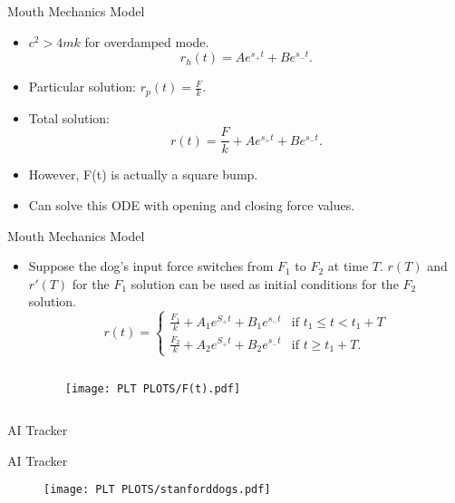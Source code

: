 \documentclass[compress,12pt,mp]{beamer}
\begin{document}
\begin{frame}[t]{Mouth Mechanics Model}
\begin{itemize}
\item \(c^2>4mk\) for overdamped mode.
    \[r_h(t)=Ae^{s_+t} + Be^{s_-t}.\]
\item Particular solution: \(r_p(t)=\frac{F}{k}.\)

    \item Total solution:
    \[r(t)=\frac{F}{k} + Ae^{s_+t} + Be^{s_-t}.\]
\item However, F(t) is actually a square bump. 
\item Can solve this ODE with opening and closing force values.
\end{itemize}
\end{frame}

\begin{frame}[t]{Mouth Mechanics Model}
\begin{itemize}
\item Suppose the dog's input force switches from \(F_1\) to \(F_2\) at time \(T\). \(r(T)\) and \(r'(T)\) for the \(F_1\) solution can be used as initial conditions for the \(F_2\) solution.
\[
r(t)=\begin{cases}
    \frac{F_1}{k}+A_1e^{S_+t}+B_1e^{s_-t} & \text{if } t_1 \leq t < t_1+T\\
    \frac{F_2}{k}+A_2e^{S_+t}+B_2e^{s_-t} & \text{if } t \geq t_1+T.
\end{cases}
\]
\begin{columns}
    \begin{column}{0.55\linewidth}
        \begin{figure}
            \centering
            \texttt{[image: PLT PLOTS/F(t).pdf]}
        \end{figure}
    \end{column}
\hfill

\end{columns}
\end{itemize}
\end{frame}

\begin{frame}[t]{AI Tracker}
\end{frame}
\begin{frame}[c]{AI Tracker}
    \begin{figure}
        \centering
\texttt{[image: PLT PLOTS/stanforddogs.pdf]}
    \end{figure}
\end{frame}
\end{document}
